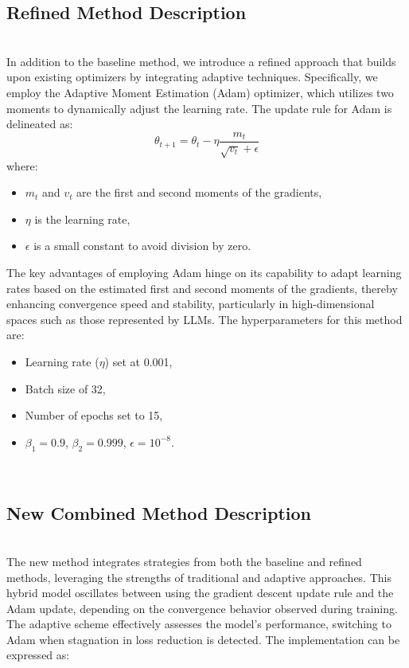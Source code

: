 \documentclass{article} %
\begin{document}
\subsection{Refined Method Description}  \\
In addition to the baseline method, we introduce a refined approach that builds upon existing optimizers by integrating adaptive techniques. Specifically, we employ the Adaptive Moment Estimation (Adam) optimizer, which utilizes two moments to dynamically adjust the learning rate. The update rule for Adam is delineated as:  \
\begin{equation}  
\theta_{t+1} = \theta_t - \eta  \frac{m_t}{\sqrt{v_t} + \epsilon}  
\end{equation}  
where:  \
\begin{itemize}  
    \item $m_t$ and $v_t$ are the first and second moments of the gradients,  
    \item $\eta$ is the learning rate,  
    \item $\epsilon$ is a small constant to avoid division by zero.  
\end{itemize}  
The key advantages of employing Adam hinge on its capability to adapt learning rates based on the estimated first and second moments of the gradients, thereby enhancing convergence speed and stability, particularly in high-dimensional spaces such as those represented by LLMs. The hyperparameters for this method are:  \
\begin{itemize}  
    \item Learning rate ($\eta$) set at 0.001,  
    \item Batch size of 32,  
    \item Number of epochs set to 15,  
    \item $\beta_1 = 0.9$, $\beta_2 = 0.999$, $\epsilon = 10^{-8}$.  
\end{itemize}  
\\\subsection{New Combined Method Description}  \\
The new method integrates strategies from both the baseline and refined methods, leveraging the strengths of traditional and adaptive approaches. This hybrid model oscillates between using the gradient descent update rule and the Adam update, depending on the convergence behavior observed during training. The adaptive scheme effectively assesses the model's performance, switching to Adam when stagnation in loss reduction is detected. The implementation can be expressed as:  \
\end{document}
